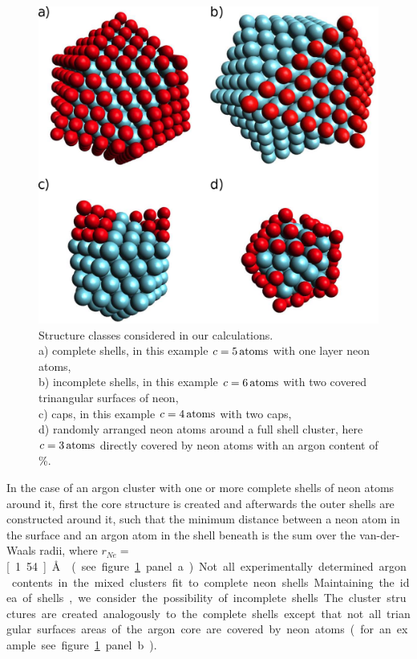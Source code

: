\begin{figure}[!h]
 \centering
 \includegraphics[scale=0.9]{pics/NeAr_structures1.eps}
 \caption{Structure classes considered in our calculations.\\
          a) complete shells, in this example $c=\unit[5]{atoms}$ with one layer
          neon atoms,\\
          b) incomplete shells, in this example
          $c=\unit[6]{atoms}$ with two covered trinangular surfaces
          of neon,\\
          c) caps, in this example $c=\unit[4]{atoms}$ with two caps,\\
          d) randomly arranged neon atoms around a full shell cluster,
          here $c=\unit[3]{atoms}$ directly covered by neon atoms
          with an argon content of \unit[47]{\%}.}
 \label{figure:structures}
\end{figure}

In the case of an argon cluster with one or more complete shells of neon
atoms around it, first the core structure is created and afterwards the
outer shells are constructed around it, such that the minimum distance between a
neon atom in the surface and an argon atom in the shell beneath is the sum
over the van-der-Waals radii, where $r_{Ne}=$\unit[1.54]{\AA} \cite{Bondi64}
(see figure \ref{figure:structures} panel a).

Not all experimentally determined argon contents in the mixed clusters
fit to complete neon shells. Maintaining the idea of shells,
we consider the possibility of incomplete shells.
The cluster structures are created analogously to the
complete shells except that not all triangular surfaces areas of the argon core
are covered by neon atoms (for an example see figure \ref{figure:structures}
panel b).

